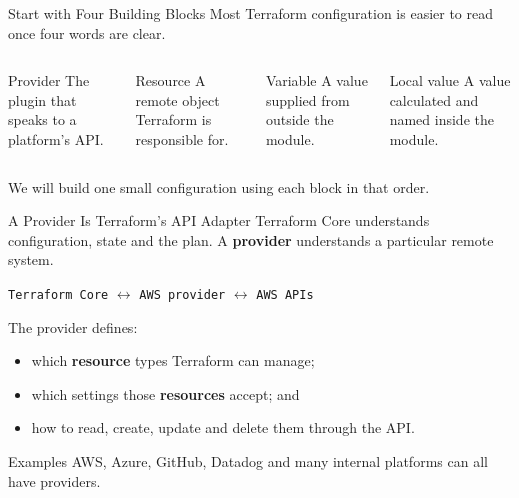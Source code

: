 \documentclass[aspectratio=169, xcolor=table]{beamer}
\begin{document}
\begin{frame}{Start with Four Building Blocks}
  Most Terraform configuration is easier to read once four words are clear.

  \vspace{0.8em}
  \begin{columns}[T]
    \begin{block}{Provider}
      The plugin that speaks to a platform's API.
    \end{block}
    \begin{block}{Resource}
      A remote object Terraform is responsible for.
    \end{block}

    \begin{block}{Variable}
      A value supplied from outside the module.
    \end{block}
    \begin{block}{Local value}
      A value calculated and named inside the module.
    \end{block}
  \end{columns}

  \vspace{2em}
  We will build one small configuration using each block in that order.
\end{frame}

\begin{frame}{A Provider Is Terraform's API Adapter}
  Terraform Core understands configuration, state and the plan. A \textbf{provider}
  understands a particular remote system.

  \vspace{0.8em}
  \begin{center}
    \texttt{Terraform Core}
    \quad $\longleftrightarrow$ \quad
    \textcolor{SecondaryAccent}{\texttt{AWS provider}}
    \quad $\longleftrightarrow$ \quad
    \texttt{AWS APIs}
  \end{center}

  \vspace{1em}
  The provider defines:
  \begin{itemize}
    \item which \textbf{resource} types Terraform can manage;
    \item which settings those \textbf{resources} accept; and
    \item how to read, create, update and delete them through the API.
  \end{itemize}

  \begin{block}{Examples}
    AWS, Azure, GitHub, Datadog and many internal platforms can all have providers.
  \end{block}
\end{frame}
\end{document}
